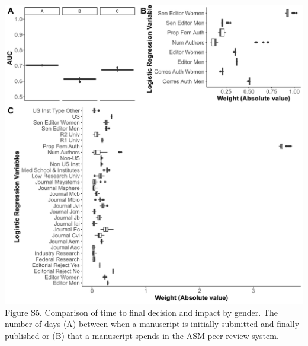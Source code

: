 \documentclass[11pt,]{article}
\begin{document}
\newpage

\includegraphics{Figure_S5.png} Figure S5. Comparison of time to final
decision and impact by gender. The number of days (A) between when a
manuscript is initially submitted and finally published or (B) that a
manuscript spends in the ASM peer review system.

\newpage
\end{document}
